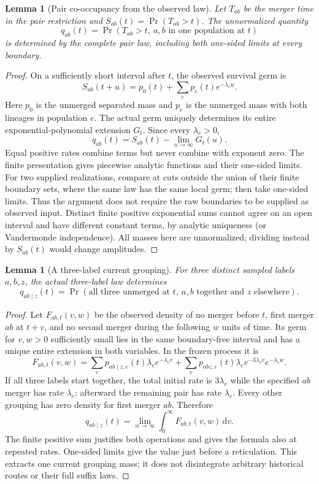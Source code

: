 \documentclass[11pt]{article}
\newtheorem{lemma}[theorem]{Lemma}
\newcommand{\dd}{\,\mathrm d}
\begin{document}
\begin{lemma}[Pair co-occupancy from the observed law]
\label{lem:pair-frozen}
Let $T_{ab}$ be the merger time in the pair restriction and $S_{ab}(t)=\Pr(T_{ab}>t)$. The unnormalized quantity
\[
 q_{ab}(t)=\Pr(T_{ab}>t,\ a,b\text{ in one population at }t)
\]
is determined by the complete pair law, including both one-sided limits at every boundary.
\end{lemma}
\begin{proof}
On a sufficiently short interval after $t$, the observed survival germ is
\[
 S_{ab}(t+u)=p_0(t)+\sum_e p_e(t)e^{-\lambda_e u}.
\]
Here $p_0$ is the unmerged separated mass and $p_e$ is the unmerged mass with both lineages in population $e$. The actual germ uniquely determines its entire exponential-polynomial extension $G_t$. Since every $\lambda_e>0$,
\[
 q_{ab}(t)=S_{ab}(t)-\lim_{u\to\infty}G_t(u).
\]
Equal positive rates combine terms but never combine with exponent zero. The finite presentation gives piecewise analytic functions and their one-sided limits. For two supplied realizations, compare at cuts outside the union of their finite boundary sets, where the same law has the same local germ; then take one-sided limits. Thus the argument does not require the raw boundaries to be supplied as observed input. Distinct finite positive exponential sums cannot agree on an open interval and have different constant terms, by analytic uniqueness (or Vandermonde independence). All masses here are unnormalized; dividing instead by $S_{ab}(t)$ would change amplitudes.
\end{proof}

\begin{lemma}[A three-label current grouping]
\label{lem:triple-frozen}
For three distinct sampled labels $a,b,z$, the actual three-label law determines
\[
 q_{ab\mid z}(t)=\Pr(\text{all three unmerged at }t,\ a,b\text{ together and }z\text{ elsewhere}).
\]
\end{lemma}
\begin{proof}
Let $F_{ab,t}(v,w)$ be the observed density of no merger before $t$, first merger $ab$ at $t+v$, and no second merger during the following $w$ units of time. Its germ for $v,w>0$ sufficiently small lies in the same boundary-free interval and has a unique entire extension in both variables. In the frozen process it is
\[
 F_{ab,t}(v,w)=\sum_e p_{ab\mid z,e}(t)\lambda_e e^{-\lambda_e v}
 +\sum_e p_{abz,e}(t)\lambda_e e^{-3\lambda_e v}e^{-\lambda_e w}.
\]
If all three labels start together, the total initial rate is $3\lambda_e$ while the specified $ab$ merger has rate $\lambda_e$; afterward the remaining pair has rate $\lambda_e$. Every other grouping has zero density for first merger $ab$. Therefore
\[
 q_{ab\mid z}(t)=\lim_{w\to\infty}\int_0^\infty F_{ab,t}(v,w)\dd v.
\]
The finite positive sum justifies both operations and gives the formula also at repeated rates. One-sided limits give the value just before a reticulation. This extracts one current grouping mass; it does not disintegrate arbitrary historical routes or their full suffix laws.
\end{proof}
\end{document}
